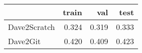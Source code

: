 \begin{tabular}{lrrr}
\toprule
{} &  train &   val &  test \\
\midrule
Dave2Scratch &  0.324 & 0.319 & 0.333 \\
Dave2Git     &  0.420 & 0.409 & 0.423 \\
\bottomrule
\end{tabular}
